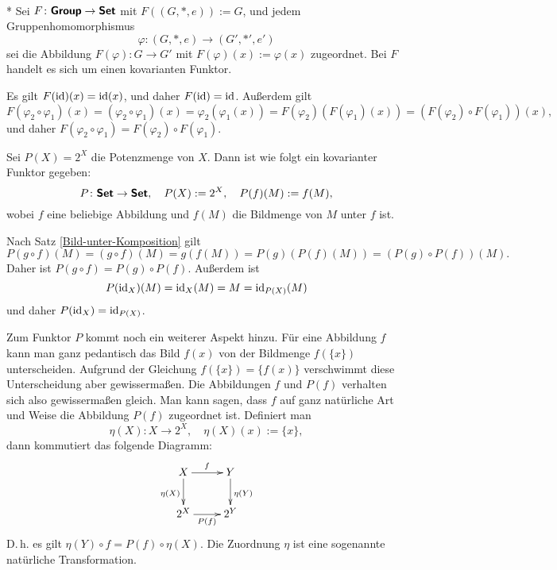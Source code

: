 \begin{Satz}[Vergissfunktor]\mbox{}\\*
Sei $F\colon\textsf{\textbf{Group}}\to\textsf{\textbf{Set}}$ mit $F((G,*,e)):=G$,
und jedem Gruppenhomomorphismus%
\[\varphi\colon (G,*,e)\to (G',*',e')\]
sei die Abbildung $F(\varphi)\colon G\to G'$ mit
$F(\varphi)(x):=\varphi(x)$ zugeordnet. Bei $F$ handelt
es sich um einen kovarianten Funktor.
\end{Satz}
Es gilt $F(\operatorname{id})(x) = \operatorname{id}(x)$, und daher $F(\operatorname{id})=\operatorname{id}$.
Außerdem gilt%
\[
F(\varphi_2\circ\varphi_1)(x) = (\varphi_2\circ\varphi_1)(x)
= \varphi_2(\varphi_1(x))
= F(\varphi_2)(F(\varphi_1)(x))
= (F(\varphi_2)\circ F(\varphi_1))(x),
\]
und daher $F(\varphi_2\circ\varphi_1)
= F(\varphi_2)\circ F(\varphi_1)$.\;\qedsymbol

\begin{Satz} Sei $P(X)=2^X$ die Potenzmenge von $X$. Dann ist
wie folgt ein kovarianter Funktor gegeben:
\[P\colon\textsf{\textbf{Set}}\to\textsf{\textbf{Set}},\quad
P(X):=2^X,\quad P(f)(M):=f(M),\]
wobei $f$ eine beliebige Abbildung
und $f(M)$ die Bildmenge von $M$ unter $f$ ist.
\end{Satz}
 Nach Satz \ref{Bild-unter-Komposition} gilt
\[P(g\circ f)(M) = (g\circ f)(M) = g(f(M))
= P(g)(P(f)(M)) = (P(g)\circ P(f))(M).\]
Daher ist $P(g\circ f)=P(g)\circ P(f)$. Außerdem ist
\[P(\operatorname{id}_X)(M) = \operatorname{id}_X(M) = M = \operatorname{id}_{P(X)}(M)\]
und daher $P(\operatorname{id}_X)=\operatorname{id}_{P(X)}$.\;\qedsymbol

Zum Funktor $P$ kommt noch ein weiterer Aspekt hinzu.
Für eine Abbildung $f$ kann man ganz pedantisch das
Bild $f(x)$ von der Bildmenge $f(\{x\})$ unterscheiden.
Aufgrund der Gleichung $f(\{x\})=\{f(x)\}$ verschwimmt diese
Unterscheidung aber gewissermaßen.
Die Abbildungen $f$ und $P(f)$ verhalten sich also
gewissermaßen gleich. Man kann sagen, dass $f$
auf ganz natürliche Art und Weise die Abbildung $P(f)$
zugeordnet ist. Definiert man
\[\eta(X)\colon X\to 2^X,\quad \eta(X)(x):=\{x\},\]
dann kommutiert das folgende Diagramm:
\[\xymatrix{
X \ar[r]^f \ar[d]_{\eta(X)} & Y \ar[d]^{\eta(Y)} \\
2^X \ar[r]_{P(f)} & 2^Y }\]
D.\,h. es gilt $\eta(Y)\circ f = P(f)\circ\eta(X)$.
Die Zuordnung $\eta$ ist eine sogenannte natürliche Transformation.

